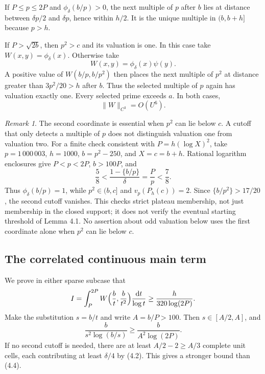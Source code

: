 \documentclass[letterpaper]{article}
\theoremstyle{definition}
\theoremstyle{remark}
\newtheorem{remark}[theorem]{Remark}
\numberwithin{equation}{section}
\begin{document}
If $P\le p\le 2P$ and $\phi_\delta(b/p)>0$, the next multiple of $p$ after $b$ lies at distance between $\delta p/2$
and $\delta p$, hence within $h/2$. It is the unique multiple in $(b,b+h]$ because $p>h$.

If $P>\sqrt{2b}$, then $p^2>c$ and its valuation is one. In this case take $W(x,y)=\phi_\delta(x)$.
Otherwise take
\[
  W(x,y)=\phi_\delta(x)\psi(y).
\]
A positive value of $W(b/p,b/p^2)$ then places the next multiple of $p^2$ at distance greater than
$3p^2/20>h$ after $b$. Thus the selected multiple of $p$ again has valuation exactly one. Every
selected prime exceeds $a$. In both cases,
\begin{equation}
  \|W\|_{C^3}=O(U^6).
\end{equation}

\begin{remark}
The second coordinate is essential when $p^2$ can lie below $c$. A cutoff that only
detects a multiple of $p$ does not distinguish valuation one from valuation two. For a finite check
consistent with $P=h(\log X)^2$, take $p=1\,000\,003$, $h=1000$, $b=p^2-250$, and $X=c=b+h$.
Rational logarithm enclosures give $P<p<2P$, $b>100P$, and
\[
  \frac58<\frac{1-\{b/p\}}{\delta}=\frac Pp<\frac78.
\]
Thus $\phi_\delta(b/p)=1$, while $p^2\in(b,c]$ and $v_p(P_h(c))=2$. Since $\{b/p^2\}>17/20$, the second cutoff
vanishes. This checks strict plateau membership, not just membership in the closed support; it
does not verify the eventual starting threshold of Lemma 4.1. No assertion about odd valuation
below uses the first coordinate alone when $p^2$ can lie below $c$.
\end{remark}

\subsection{The correlated continuous main term}

We prove in either sparse subcase that
\begin{equation}
  I=\int_P^{2P}W\Bigl(\frac bt,\frac b{t^2}\Bigr)\frac{\mathrm dt}{\log t}\ge\frac{h}{320\log(2P)}.
\end{equation}
Make the substitution $s=b/t$ and write $A=b/P>100$. Then $s\in[A/2,A]$, and
\begin{equation}
  \frac{b}{s^2\log(b/s)}\ge\frac{b}{A^2\log(2P)}.
\end{equation}
If no second cutoff is needed, there are at least $A/2-2\ge A/3$ complete unit cells, each
contributing at least $\delta/4$ by (4.2). This gives a stronger bound than (4.4).
\end{document}
